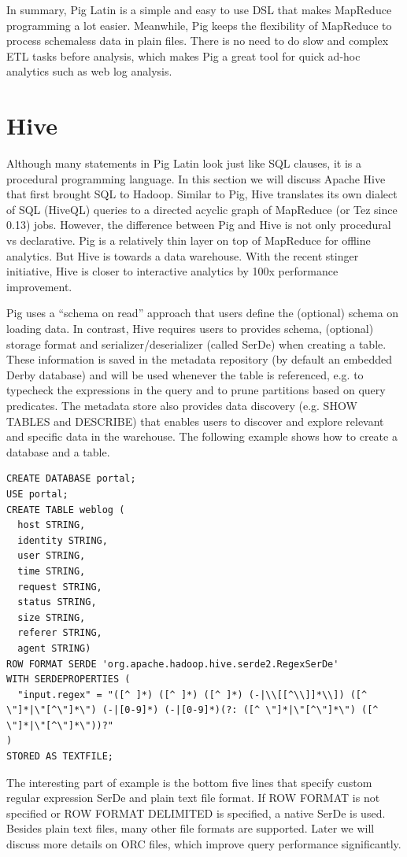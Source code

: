 \documentclass[11pt]{book}
\begin{document}
In summary, Pig Latin is a simple and easy to use DSL that makes MapReduce programming a lot easier. Meanwhile, Pig keeps the flexibility of MapReduce to process schemaless data in plain files. There is no need to do slow and complex ETL tasks before analysis, which makes Pig a great tool for quick ad-hoc analytics such as web log analysis.

\section{Hive}
Although many statements in Pig Latin look just like SQL clauses, it is a procedural programming language. In this section we will discuss Apache Hive that first brought SQL to Hadoop. Similar to Pig, Hive translates its own dialect of SQL (HiveQL) queries to a directed acyclic graph of MapReduce (or Tez since 0.13) jobs. However, the difference between Pig and Hive is not only procedural vs declarative. Pig is a relatively thin layer on top of MapReduce for offline analytics. But Hive is towards a data warehouse. With the recent stinger initiative, Hive is closer to interactive analytics by 100x performance improvement.

Pig uses a ``schema on read'' approach that users define the (optional) schema on loading data. In contrast, Hive requires users to provides schema, (optional) storage format and serializer/deserializer (called SerDe) when creating a table. These information is saved in the metadata repository (by default an embedded Derby database) and will be used whenever the table is referenced, e.g. to typecheck the expressions in the query and to prune partitions based on query predicates. The metadata store also provides data discovery (e.g. SHOW TABLES and DESCRIBE) that enables users to discover and explore relevant and specific data in the warehouse. The following example shows how to create a database and a table.

\begin{lstlisting}
CREATE DATABASE portal;
USE portal;
CREATE TABLE weblog (
  host STRING,
  identity STRING,
  user STRING,
  time STRING,
  request STRING,
  status STRING,
  size STRING,
  referer STRING,
  agent STRING)
ROW FORMAT SERDE 'org.apache.hadoop.hive.serde2.RegexSerDe'
WITH SERDEPROPERTIES (
  "input.regex" = "([^ ]*) ([^ ]*) ([^ ]*) (-|\\[[^\\]]*\\]) ([^ \"]*|\"[^\"]*\") (-|[0-9]*) (-|[0-9]*)(?: ([^ \"]*|\"[^\"]*\") ([^ \"]*|\"[^\"]*\"))?"
)
STORED AS TEXTFILE;
\end{lstlisting}
The interesting part of example is the bottom five lines that specify custom regular expression SerDe and plain text file format. If ROW FORMAT is not specified or ROW FORMAT DELIMITED is specified, a native SerDe is used. Besides plain text files, many other file formats are supported. Later we will discuss more details on ORC files, which improve query performance significantly.
\end{document}
